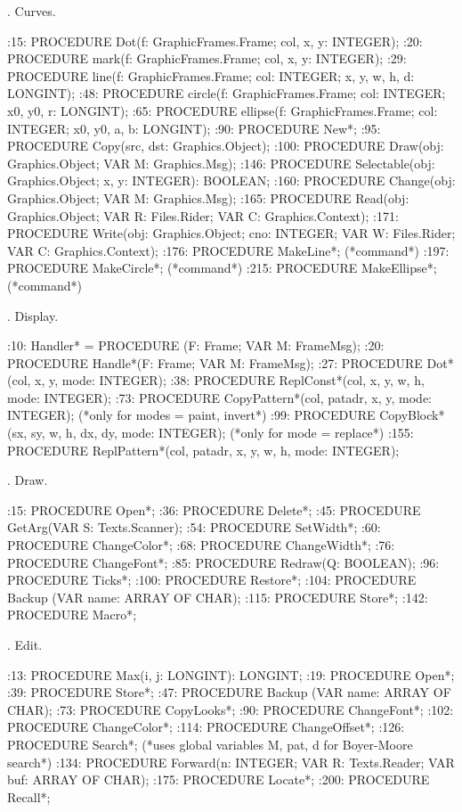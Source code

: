 

. Curves.

:15:  PROCEDURE Dot(f: GraphicFrames.Frame; col, x, y: INTEGER);
:20:  PROCEDURE mark(f: GraphicFrames.Frame; col, x, y: INTEGER);
:29:  PROCEDURE line(f: GraphicFrames.Frame; col: INTEGER; x, y, w, h, d: LONGINT);
:48:  PROCEDURE circle(f: GraphicFrames.Frame; col: INTEGER; x0, y0, r: LONGINT);
:65:  PROCEDURE ellipse(f: GraphicFrames.Frame; col: INTEGER; x0, y0, a, b: LONGINT);
:90:  PROCEDURE New*;
:95:  PROCEDURE Copy(src, dst: Graphics.Object);
:100:  PROCEDURE Draw(obj: Graphics.Object; VAR M: Graphics.Msg);
:146:  PROCEDURE Selectable(obj: Graphics.Object; x, y: INTEGER): BOOLEAN;
:160:  PROCEDURE Change(obj: Graphics.Object; VAR M: Graphics.Msg);
:165:  PROCEDURE Read(obj: Graphics.Object; VAR R: Files.Rider; VAR C: Graphics.Context);
:171:  PROCEDURE Write(obj: Graphics.Object; cno: INTEGER; VAR W: Files.Rider; VAR C: Graphics.Context);
:176:  PROCEDURE MakeLine*;  (*command*)
:197:  PROCEDURE MakeCircle*;  (*command*)
:215:  PROCEDURE MakeEllipse*;  (*command*)

. Display.

:10:    Handler* = PROCEDURE (F: Frame; VAR M: FrameMsg);
:20:  PROCEDURE Handle*(F: Frame; VAR M: FrameMsg);
:27:  PROCEDURE Dot*(col, x, y, mode: INTEGER);
:38:  PROCEDURE ReplConst*(col, x, y, w, h, mode: INTEGER);
:73:  PROCEDURE CopyPattern*(col, patadr, x, y, mode: INTEGER);  (*only for modes = paint, invert*)
:99:  PROCEDURE CopyBlock*(sx, sy, w, h, dx, dy, mode: INTEGER); (*only for mode = replace*)
:155:  PROCEDURE ReplPattern*(col, patadr, x, y, w, h, mode: INTEGER);

. Draw.

:15:  PROCEDURE Open*;
:36:  PROCEDURE Delete*;
:45:  PROCEDURE GetArg(VAR S: Texts.Scanner);
:54:  PROCEDURE SetWidth*;
:60:  PROCEDURE ChangeColor*;
:68:  PROCEDURE ChangeWidth*;
:76:  PROCEDURE ChangeFont*;
:85:  PROCEDURE Redraw(Q: BOOLEAN);
:96:  PROCEDURE Ticks*;
:100:  PROCEDURE Restore*;
:104:  PROCEDURE Backup (VAR name: ARRAY OF CHAR);
:115:  PROCEDURE Store*;
:142:  PROCEDURE Macro*;

. Edit.

:13:  PROCEDURE Max(i, j: LONGINT): LONGINT;
:19:  PROCEDURE Open*;
:39:  PROCEDURE Store*;
:47:    PROCEDURE Backup (VAR name: ARRAY OF CHAR);
:73:  PROCEDURE CopyLooks*;
:90:  PROCEDURE ChangeFont*;
:102:  PROCEDURE ChangeColor*;
:114:  PROCEDURE ChangeOffset*;
:126:  PROCEDURE Search*;  (*uses global variables M, pat, d for Boyer-Moore search*)
:134:    PROCEDURE Forward(n: INTEGER; VAR R: Texts.Reader; VAR buf: ARRAY OF CHAR);
:175:  PROCEDURE Locate*;
:200:  PROCEDURE Recall*;

